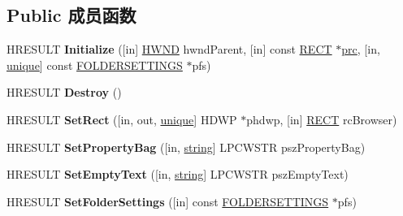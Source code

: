 \subsection*{Public 成员函数}
\begin{DoxyCompactItemize}
\item 
\mbox{\label{interface_i_explorer_browser_aca5c03a258a3da81c191987527e85e5a}} 
H\+R\+E\+S\+U\+LT {\bfseries Initialize} (\mbox{[}in\mbox{]} \hyperlink{interfacevoid}{H\+W\+ND} hwnd\+Parent, \mbox{[}in\mbox{]} const \hyperlink{structtag_r_e_c_t}{R\+E\+CT} $\ast$\hyperlink{structtag_r_e_c_t}{prc}, \mbox{[}in, \hyperlink{interfaceunique}{unique}\mbox{]} const \hyperlink{struct_f_o_l_d_e_r_s_e_t_t_i_n_g_s}{F\+O\+L\+D\+E\+R\+S\+E\+T\+T\+I\+N\+GS} $\ast$pfs)
\item 
\mbox{\label{interface_i_explorer_browser_aa78fc7beca8e0d6575d719de7fd9c27f}} 
H\+R\+E\+S\+U\+LT {\bfseries Destroy} ()
\item 
\mbox{\label{interface_i_explorer_browser_ac39d4cb02e9269ad9597d83d22883ac6}} 
H\+R\+E\+S\+U\+LT {\bfseries Set\+Rect} (\mbox{[}in, out, \hyperlink{interfaceunique}{unique}\mbox{]} H\+D\+WP $\ast$phdwp, \mbox{[}in\mbox{]} \hyperlink{structtag_r_e_c_t}{R\+E\+CT} rc\+Browser)
\item 
\mbox{\label{interface_i_explorer_browser_a77742ff656b509fd69405916a41e8688}} 
H\+R\+E\+S\+U\+LT {\bfseries Set\+Property\+Bag} (\mbox{[}in, \hyperlink{structstring}{string}\mbox{]} L\+P\+C\+W\+S\+TR psz\+Property\+Bag)
\item 
\mbox{\label{interface_i_explorer_browser_a3c60402869b370224bcd1ac07c3b84d3}} 
H\+R\+E\+S\+U\+LT {\bfseries Set\+Empty\+Text} (\mbox{[}in, \hyperlink{structstring}{string}\mbox{]} L\+P\+C\+W\+S\+TR psz\+Empty\+Text)
\item 
\mbox{\label{interface_i_explorer_browser_afc5a94da280bdf0e89d0bc3eadb82996}} 
H\+R\+E\+S\+U\+LT {\bfseries Set\+Folder\+Settings} (\mbox{[}in\mbox{]} const \hyperlink{struct_f_o_l_d_e_r_s_e_t_t_i_n_g_s}{F\+O\+L\+D\+E\+R\+S\+E\+T\+T\+I\+N\+GS} $\ast$pfs)
\item 
\mbox{\label{interface_i_explorer_browser_abf351992b92c44243c69dc98471d353f}} 

\end{DoxyCompactItemize}

